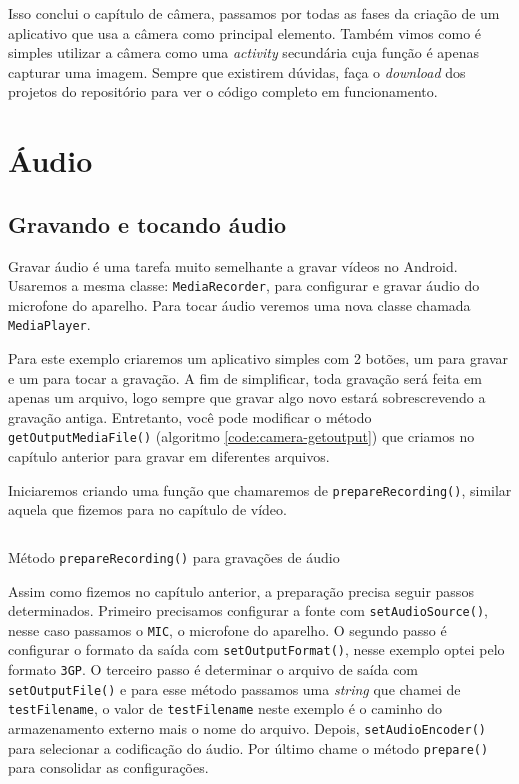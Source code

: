 \documentclass[a4paper,12pt,brazil,oneside]{book}
\begin{document}
\begin{singlespace}
		Isso conclui o capítulo de câmera, passamos por todas as fases da criação de um aplicativo que usa a câmera como principal elemento. Também vimos como é simples utilizar a câmera como uma \emph{activity} secundária cuja função é apenas capturar uma imagem. Sempre que existirem dúvidas, faça o \emph{download} dos projetos do repositório para ver o código completo em funcionamento.

\chapter{Áudio}
	\section{Gravando e tocando áudio}

		Gravar áudio é uma tarefa muito semelhante a gravar vídeos no Android. Usaremos a mesma classe: \texttt{MediaRecorder}, para configurar e gravar áudio do microfone do aparelho. Para tocar áudio veremos uma nova classe chamada \texttt{MediaPlayer}.

		Para este exemplo criaremos um aplicativo simples com 2 botões, um para gravar e um para tocar a gravação. A fim de simplificar, toda gravação será feita em apenas um arquivo, logo sempre que gravar algo novo estará sobrescrevendo a gravação antiga. Entretanto, você pode modificar o método \texttt{getOutputMediaFile()} (algoritmo \ref{code:camera-getoutput}) que criamos no capítulo anterior para gravar em diferentes arquivos.

		Iniciaremos criando uma função que chamaremos de \texttt{prepareRecording()}, similar aquela que fizemos para no capítulo de vídeo.

		\begin{listing}[H]
		\inputminted[linenos=true,fontsize=\small,frame=lines, framesep=2mm, tabsize=2,numbersep=5pt]{java}{src/api/audio/prepare.java}
		\caption{Método \texttt{prepareRecording()} para gravações de áudio}
		\label{code:audioprepare}
		\end{listing} 		

		Assim como fizemos no capítulo anterior, a preparação precisa seguir passos determinados. Primeiro precisamos configurar a fonte com \texttt{setAudioSource()}, nesse caso passamos o \texttt{MIC}, o microfone do aparelho. O segundo passo é configurar o formato da saída com \texttt{setOutputFormat()}, nesse exemplo optei pelo formato \texttt{3GP}. O terceiro passo é determinar o arquivo de saída com \texttt{setOutputFile()} e para esse método passamos uma \emph{string} que chamei de \texttt{testFilename}, o valor de \texttt{testFilename} neste exemplo é o caminho do armazenamento externo mais o nome do arquivo. Depois, \texttt{setAudioEncoder()} para selecionar a codificação do áudio. Por último chame o método \texttt{prepare()} para consolidar as configurações.


\end{singlespace}
\end{document}
